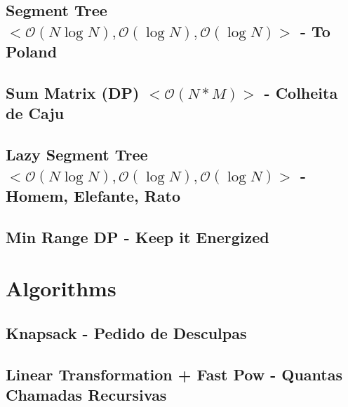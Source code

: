 \documentclass[11pt, a4paper, twoside, notitlepage]{article}
\begin{document}


\subsection{Segment Tree $<\mathcal{O}(N\log N), \mathcal{O}(\log N), \mathcal{O}(\log N)>$ - To Poland}



\subsection{Sum Matrix (DP) $<\mathcal{O}(N*M)>$ - Colheita de Caju}



\subsection{Lazy Segment Tree $<\mathcal{O}(N\log N), \mathcal{O}(\log N), \mathcal{O}(\log N)>$ - Homem, Elefante, Rato}



\subsection{Min Range DP - Keep it Energized}



\newpage

\section{Algorithms}

\subsection{Knapsack - Pedido de Desculpas}



\subsection{Linear Transformation + Fast Pow - Quantas Chamadas Recursivas}


\end{document}
